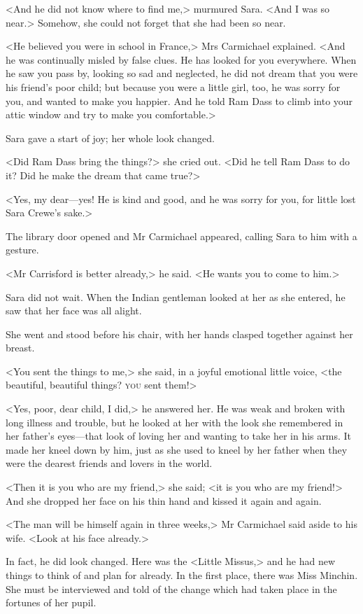 <And he did not know where to find me,> murmured Sara. <And I was so near.> Somehow, she could not forget that she had been so near.

<He believed you were in school in France,> Mrs Carmichael explained. <And he was continually misled by false clues. He has looked for you everywhere. When he saw you pass by, looking so sad and neglected, he did not dream that you were his friend's poor child; but because you were a little girl, too, he was sorry for you, and wanted to make you happier. And he told Ram Dass to climb into your attic window and try to make you comfortable.>

Sara gave a start of joy; her whole look changed.

<Did Ram Dass bring the things?> she cried out. <Did he tell Ram Dass to do it? Did he make the dream that came true?>

<Yes, my dear—yes! He is kind and good, and he was sorry for you, for little lost Sara Crewe's sake.>

The library door opened and Mr Carmichael appeared, calling Sara to him with a gesture.

<Mr Carrisford is better already,> he said. <He wants you to come to him.>

Sara did not wait. When the Indian gentleman looked at her as she entered, he saw that her face was all alight.

She went and stood before his chair, with her hands clasped together against her breast.

<You sent the things to me,> she said, in a joyful emotional little voice, <the beautiful, beautiful things? \textsc{you} sent them!>

<Yes, poor, dear child, I did,> he answered her. He was weak and broken with long illness and trouble, but he looked at her with the look she remembered in her father's eyes—that look of loving her and wanting to take her in his arms. It made her kneel down by him, just as she used to kneel by her father when they were the dearest friends and lovers in the world.

<Then it is you who are my friend,> she said; <it is you who are my friend!> And she dropped her face on his thin hand and kissed it again and again.

<The man will be himself again in three weeks,> Mr Carmichael said aside to his wife. <Look at his face already.>

In fact, he did look changed. Here was the <Little Missus,> and he had new things to think of and plan for already. In the first place, there was Miss Minchin. She must be interviewed and told of the change which had taken place in the fortunes of her pupil.

